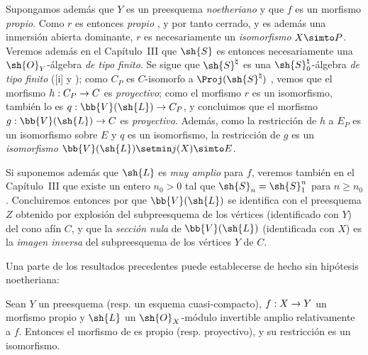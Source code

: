 \documentclass[oneside,10pt]{amsart}
\makeatletter
\renewcommand{\geq}{\geqslant}
\newcommand{\ega@arrow}[2]{\mathchoice{#1}{#2}{#2}{#2}}
\renewcommand{\to}{\ega@arrow{\longrightarrow}{\rightarrow}}
\let\EGAOriginalLabel\label
\renewcommand{\label}[1]{\phantomsection\EGAOriginalLabel{#1}}
\makeatother
\begin{document}
\begin{remark}[8.8.3]
\label{II.8.8.3}
Supongamos además que $Y$ es un preesquema \emph{noetheriano} y que $f$ es un morfismo \emph{propio}.
Como $r$ es entonces \emph{propio} , y por tanto cerrado, y es además una inmersión abierta dominante, $r$ es necesariamente un \emph{isomorfismo} $X\simto P$.
Veremos además en el Capítulo~III  que $\sh{S}$ es entonces necesariamente una $\sh{O}_Y$-álgebra \emph{de tipo finito}.
Se sigue que $\sh{S}^\natural$ es una $\sh{S}_0^\natural$-álgebra \emph{de tipo finito} ([i] y );
como $C_P$ es $C$-isomorfo a $\Proj(\sh{S}^\natural)$ , vemos que el morfismo $h:C_P\to C$ es \emph{proyectivo};
como el morfismo $r$ es un isomorfismo, también lo es $q:\bb{V}(\sh{L})\to C_P$, y concluimos que el morfismo $g:\bb{V}(\sh{L})\to C$ es \emph{proyectivo}.
Además, como la restricción de $h$ a $E_P$ es un isomorfismo sobre $E$ y $q$ es un isomorfismo, la restricción  de $g$ es un \emph{isomorfismo} $\bb{V}(\sh{L})\setmin j(X)\simto E$.

Si suponemos además que $\sh{L}$ es \emph{muy amplio} para $f$, veremos también en el Capítulo~III  que existe un entero $n_0>0$ tal que $\sh{S}_n=\sh{S}_1^n$ para $n\geq n_0$.
Concluiremos entonces por  que $\bb{V}(\sh{L})$ se identifica con el preesquema $Z$ obtenido por explosión del subpreesquema de los vértices (identificado con $Y$) del cono afín $C$,
y que la \emph{sección nula} de $\bb{V}(\sh{L})$ (identificada con $X$) es la \emph{imagen inversa} del subpreesquema de los vértices $Y$ de $C$.

Una parte de los resultados precedentes puede establecerse de hecho sin hipótesis noetheriana:
\end{remark}
\begin{corollary}[8.8.4]
\label{II.8.8.4}
Sean $Y$ un preesquema \textup{(resp.} un esquema cuasi-compacto\textup{)}, $f:X\to Y$ un morfismo propio y $\sh{L}$ un $\sh{O}_X$-módulo invertible amplio relativamente a $f$.
Entonces el morfismo de  es propio \textup{(resp.} proyectivo\textup{)}, y su restricción  es un isomorfismo.
\end{corollary}
\end{document}
